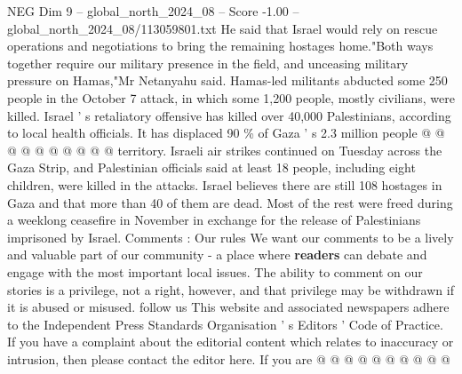 \begin{textsample}{NEG Dim 9 – global\_north\_2024\_08 – Score -1.00 – global\_north\_2024\_08/113059801.txt}
He said that Israel would rely on rescue operations and negotiations to bring the remaining hostages home."Both ways together require our military presence in the field, and unceasing military pressure on Hamas,"Mr Netanyahu said.
Hamas-led militants abducted some 250 people in the October 7 attack, in which some 1,200 people, mostly civilians, were killed.
Israel ' s retaliatory offensive has killed over 40,000 Palestinians, according to local health officials.
It has displaced 90 \% of Gaza ' s 2.3 million people @ @ @ @ @ @ @ @ @ @ territory.
Israeli air strikes continued on Tuesday across the Gaza Strip, and Palestinian officials said at least 18 people, including eight children, were killed in the attacks.
Israel believes there are still 108 hostages in Gaza and that more than 40 of them are dead.
Most of the rest were freed during a weeklong ceasefire in November in exchange for the release of Palestinians imprisoned by Israel.
Comments : Our rules We want our comments to be a lively and valuable part of our community - a place where \textbf{readers} can debate and engage with the most important local issues.
The ability to comment on our stories is a privilege, not a right, however, and that privilege may be withdrawn if it is abused or misused. follow us This website and associated newspapers adhere to the Independent Press Standards Organisation ' s Editors ' Code of Practice.
If you have a complaint about the editorial content which relates to inaccuracy or intrusion, then please contact the editor here.
If you are @ @ @ @ @ @ @ @ @ @

\end{textsample}
